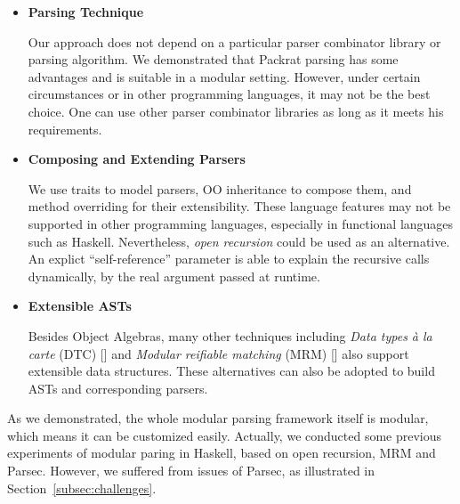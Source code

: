 \begin{itemize}

\item {\bf Parsing Technique}

Our approach does not depend on a particular parser combinator library or parsing algorithm. We demonstrated that Packrat parsing has some advantages and is suitable in a modular setting. However, under certain circumstances or in other programming languages, it may not be the best choice. One can use other parser combinator libraries as long as it meets his requirements.

\item {\bf Composing and Extending Parsers}

We use traits to model parsers, OO inheritance to compose them, and method overriding for their extensibility. These language features may not be supported in other programming languages, especially in functional languages such as Haskell. Nevertheless, \textit{open recursion} could be used as an alternative. An explict ``self-reference'' parameter is able to explain the recursive calls dynamically, by the real argument passed at runtime.

\item {\bf Extensible ASTs}

Besides Object Algebras, many other techniques including \textit{Data types à la carte} (DTC) [] and \textit{Modular reifiable matching} (MRM) [] also support extensible data structures. These alternatives can also be adopted to build ASTs and corresponding parsers.

\end{itemize}

As we demonstrated, the whole modular parsing framework itself is modular, which means it can be customized easily. Actually, we conducted some previous experiments of modular paring in Haskell, based on open recursion, MRM and Parsec. However, we suffered from issues of Parsec, as illustrated in Section~\ref{subsec:challenges}. 
